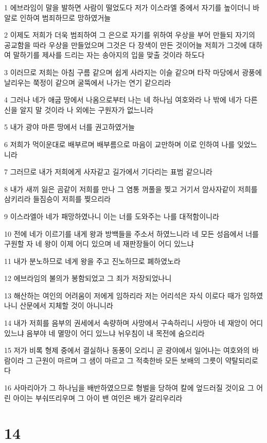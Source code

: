 \par 1 에브라임이 말을 발하면 사람이 떨었도다 저가 이스라엘 중에서 자기를 높이더니 바알로 인하여 범죄하므로 망하였거늘
\par 2 이제도 저희가 더욱 범죄하여 그 은으로 자기를 위하여 우상을 부어 만들되 자기의 공교함을 따라 우상을 만들었으며 그것은 다 장색이 만든 것이어늘 저희가 그것에 대하여 말하기를 제사를 드리는 자는 송아지의 입을 맞출 것이라 하도다
\par 3 이러므로 저희는 아침 구름 같으며 쉽게 사라지는 이슬 같으며 타작 마당에서 광풍에 날리우는 쭉정이 같으며 굴뚝에서 나가는 연기 같으리라
\par 4 그러나 네가 애굽 땅에서 나옴으로부터 나는 네 하나님 여호와라 나 밖에 네가 다른 신을 알지 말 것이라 나 외에는 구원자가 없느니라
\par 5 내가 광야 마른 땅에서 너를 권고하였거늘
\par 6 저희가 먹이운대로 배부르며 배부름으로 마음이 교만하며 이로 인하여 나를 잊었느니라
\par 7 그러므로 내가 저희에게 사자같고 길가에서 기다리는 표범 같으니라
\par 8 내가 새끼 잃은 곰같이 저희를 만나 그 염통 꺼풀을 찢고 거기서 암사자같이 저희를 삼키리라 들짐승이 저희를 찢으리라
\par 9 이스라엘아 네가 패망하였나니 이는 너를 도와주는 나를 대적함이니라
\par 10 전에 네가 이르기를 내게 왕과 방백들을 주소서 하였느니라 네 모든 성읍에서 너를 구원할 자 네 왕이 이제 어디 있으며 네 재판장들이 어디 있느냐
\par 11 내가 분노하므로 네게 왕을 주고 진노하므로 폐하였노라
\par 12 에브라임의 불의가 봉함되었고 그 죄가 저장되었나니
\par 13 해산하는 여인의 어려움이 저에게 임하리라 저는 어리석은 자식 이로다 때가 임하였나니 산문에서 지체할 것이 아니니라
\par 14 내가 저희를 음부의 권세에서 속량하며 사망에서 구속하리니 사망아 네 재앙이 어디 있느냐 음부야 네 멸망이 어디 있느냐 뉘우침이 내 목전에 숨으리라
\par 15 저가 비록 형제 중에서 결실하나 동풍이 오리니 곧 광야에서 일어나는 여호와의 바람이라 그 근원이 마르며 그 샘이 마르고 그 적축한바 모든 보배의 그릇이 약탈되리로다
\par 16 사마리아가 그 하나님을 배반하였으므로 형벌을 당하여 칼에 엎드러질 것이요 그 어린 아이는 부숴뜨리우며 그 아이 밴 여인은 배가 갈리우리라

\chapter{14}

